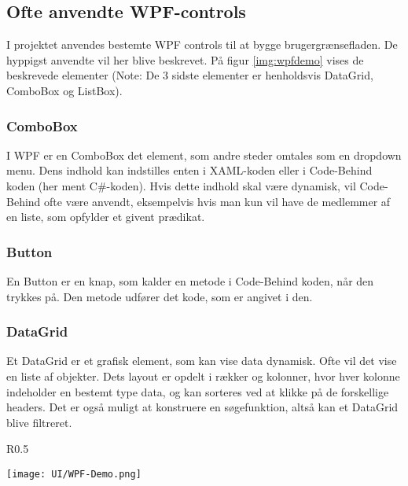 \subsection{Ofte anvendte WPF-controls}
I projektet anvendes bestemte WPF controls til at bygge brugergrænsefladen. 
De hyppigst anvendte vil her blive beskrevet. 
På figur \ref{img:wpfdemo} vises de beskrevede elementer (Note: De 3 sidste elementer er henholdsvis DataGrid, ComboBox og ListBox).

\subsubsection*{ComboBox}
I WPF er en ComboBox det element, som andre steder omtales som en dropdown menu. 
Dens indhold kan indstilles enten i XAML-koden eller i Code-Behind koden (her ment C\#-koden).
Hvis dette indhold skal være dynamisk, vil Code-Behind ofte være anvendt, eksempelvis hvis man kun vil have de medlemmer af en liste, som opfylder et givent prædikat. 

\subsubsection*{Button}
En Button er en knap, som kalder en metode i Code-Behind koden, når den trykkes på. 
Den metode udfører det kode, som er angivet i den.

\subsubsection*{DataGrid}
Et DataGrid er et grafisk element, som kan vise data dynamisk.
Ofte vil det vise en liste af objekter.
Dets layout er opdelt i rækker og kolonner, hvor hver kolonne indeholder en bestemt type data, og kan sorteres ved at klikke på de forskellige headers.
Det er også muligt at konstruere en søgefunktion, altså kan et DataGrid blive filtreret.

\begin{wrapfigure}[22]{R}{0.5\textwidth}
    \label{img:wpfdemo}
    \vspace{-30pt}
    \begin{center}
        \texttt{[image: UI/WPF-Demo.png]}
    \end{center}
    \vspace{-15pt}
    \caption{Demonstration af WPFs Controls}
    \vspace{-15pt}
\end{wrapfigure}

